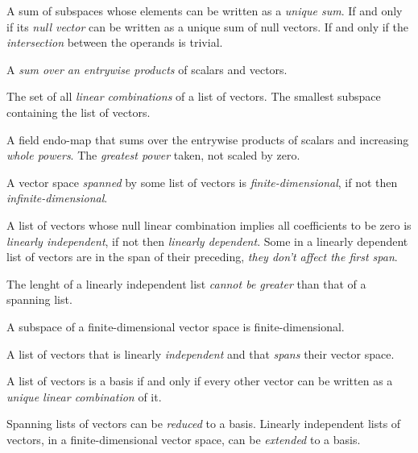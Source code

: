 \begin{multicols}{3}
  A sum of subspaces whose elements can be written as a \textit{unique sum}.
  If and only if its \textit{null vector} can be written as a unique sum of null vectors.
  If and only if the \textit{intersection} between the operands is trivial.

  A \textit{sum over an entrywise products} of scalars and vectors.
  
  The set of all \textit{linear combinations} of a list of vectors.
  The smallest subspace containing the list of vectors.

  A field endo-map that sums over the entrywise products of scalars and increasing \textit{whole powers}.
  The \textit{greatest power} taken, not scaled by zero.
  
  A vector space \textit{spanned} by some list of vectors is \textit{finite-dimensional}, if not then \textit{infinite-dimensional}.
  
  A list of vectors whose null linear combination implies all coefficients to be zero is \textit{linearly independent},
  if not then \textit{linearly dependent}.
  Some in a linearly dependent list of vectors are in the span of their preceding, \textit{they don't affect the first span}.
  
  The lenght of a linearly independent list \textit{cannot be greater} than that of a spanning list.
  
  A subspace of a finite-dimensional vector space is finite-dimensional.
  
  A list of vectors that is linearly \textit{independent} and that \textit{spans} their vector space.
  
  A list of vectors is a basis if and only if every other vector can be written as a \textit{unique linear combination} of it.
  
  Spanning lists of vectors can be \textit{reduced} to a basis. Linearly independent lists of vectors, in a finite-dimensional
  vector space, can be \textit{extended} to a basis.


\end{multicols}

